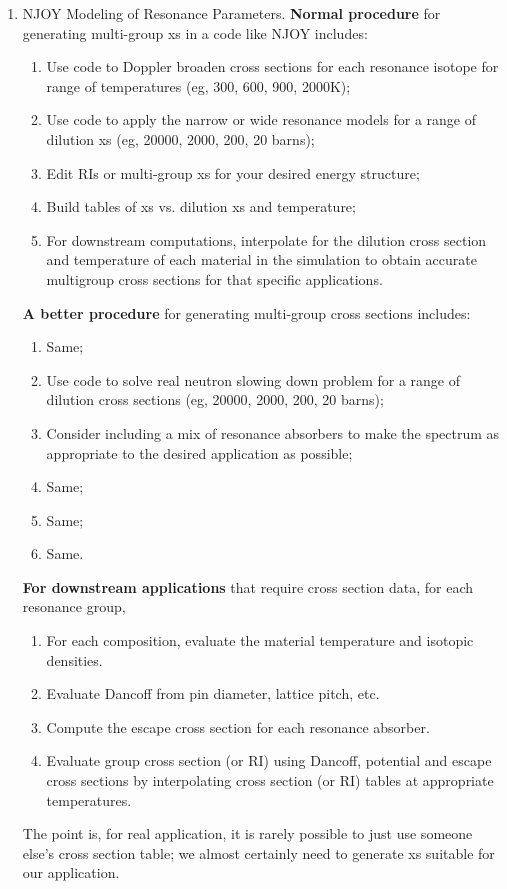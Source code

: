 \documentclass{school-22.211-notes}
\begin{document}
\begin{enumerate}
\item NJOY Modeling of Resonance Parameters. \textbf{Normal procedure} for generating multi-group xs in a code like NJOY includes:
\begin{enumerate}
\item Use code to Doppler broaden cross sections for each resonance isotope for range of temperatures (eg, 300, 600, 900, 2000K); 
\item Use code to apply the narrow or wide resonance models for a range of dilution xs (eg, 20000, 2000, 200, 20 barns); 
\item Edit RIs or multi-group xs for your desired energy structure; 
\item Build tables of xs vs. dilution xs and temperature;
\item For downstream computations, interpolate for the dilution cross section and temperature of each material in the simulation to obtain accurate multigroup cross sections for that specific applications. 
\end{enumerate}

\textbf{A better procedure} for generating multi-group cross sections includes:
\begin{enumerate}
\item Same;
\item Use code to solve real neutron slowing down problem for a range of dilution cross sections (eg, 20000, 2000, 200, 20 barns);
\item Consider including a mix of resonance absorbers to make the spectrum as appropriate to the desired application as possible;
\item Same;
\item Same;
\item Same.
\end{enumerate}

\textbf{For downstream applications} that require cross section data, for each resonance group,
\begin{enumerate}
\item For each composition, evaluate the material temperature and isotopic densities. 
\item Evaluate Dancoff from pin diameter, lattice pitch, etc. 
\item Compute the escape cross section for each resonance absorber.
\item Evaluate group cross section (or RI) using Dancoff, potential and escape cross sections by interpolating cross section (or RI) tables at appropriate temperatures. 
\end{enumerate}
The point is, for real application, it is rarely possible to just use someone else's cross section table; we almost certainly need to generate xs suitable for our application. 

\end{enumerate}
\end{document}

